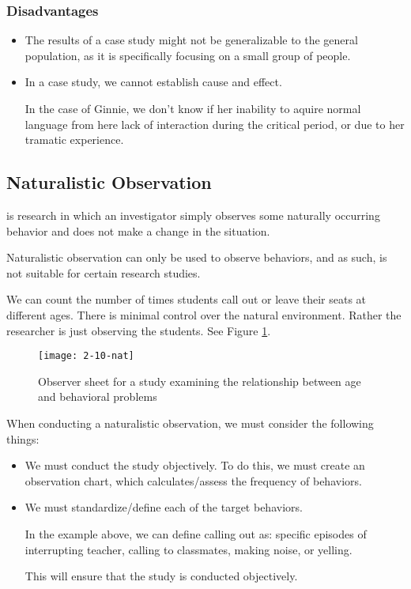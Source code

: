 \documentclass[../main/main.tex]{subfiles}
\begin{document}
\subsubsection{Disadvantages}

\begin{itemize}
\item
The results of a case study might not be generalizable to the general population, as it is specifically focusing on a small group of people.
  \item In a case study, we cannot establish cause and effect.
        \begin{example}
In the case of Ginnie, we don't know if her inability to aquire normal language from here lack of interaction during the critical period, or due to her tramatic experience.
        \end{example}
\end{itemize}

\subsection{Naturalistic Observation}
\begin{definition}
 is research in which an investigator simply observes some naturally occurring behavior and does not make a change in the situation.
\end{definition}

\begin{remark}
Naturalistic observation can only be used to observe behaviors, and as such, is not suitable for certain research studies.
\end{remark}
\begin{example}
We can count the number of times students call out or leave their seats at different ages. There is minimal control over the natural environment. Rather the researcher is just observing the students. See Figure \ref{fig:2-10-nat}.
\end{example}
\begin{figure}[htpb]
  \centering
  \texttt{[image: 2-10-nat]}
  \caption{Observer sheet for a study examining the relationship between age and behavioral problems}
  \label{fig:2-10-nat}
\end{figure}

When conducting a naturalistic observation, we must consider the following things:

\begin{itemize}
\item We must conduct the study objectively. To do this, we must create an observation chart, which calculates/assess the frequency of behaviors.
        \item We must standardize/define each of the target behaviors.
        \begin{example}
          In the example above, we can define calling out as: specific episodes of interrupting teacher, calling to classmates, making noise, or yelling.
        \end{example}
        This will ensure that the study is conducted objectively.
\end{itemize}
\end{document}
